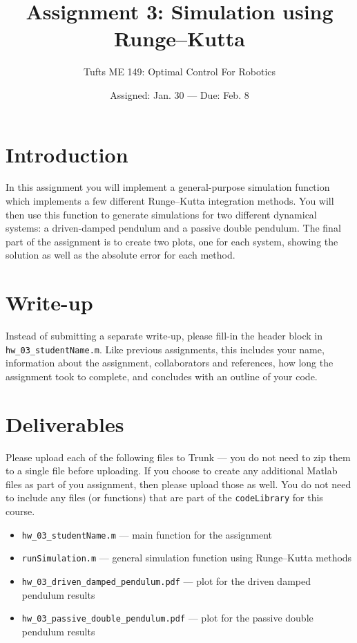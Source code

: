 

\title{Assignment 3:  Simulation using Runge--Kutta}
\date{Assigned:  Jan. 30  ---  Due:  Feb. 8}
\author{Tufts ME 149:  Optimal Control For Robotics}

\maketitle

\section*{Introduction}

In this assignment you will implement a general-purpose simulation function
which implements a few different Runge--Kutta integration methods.
You will then use this function to generate simulations for two different dynamical systems:
a driven-damped pendulum and a passive double pendulum.
The final part of the assignment is to create two plots, one for each system,
showing the solution as well as the absolute error for each method.

\section*{Write-up}

Instead of submitting a separate write-up,
please fill-in the header block in \texttt{hw\_03\_studentName.m}.
Like previous assignments, this includes
your name, information about the assignment, collaborators and references,
how long the assignment took to complete, and
concludes with an outline of your code.

\section*{Deliverables}

Please upload each of the following files to Trunk ---
you do not need to zip them to a single file before uploading.
If you choose to create any additional Matlab files as part of you assignment,
then please upload those as well.
You do not need to include any files (or functions)
that are part of the \texttt{codeLibrary} for this course.

\vspace{-0.6em} \begin{itemize}  \setlength\itemsep{0em}
 \item \texttt{hw\_03\_studentName.m} --- main function for the assignment
 \item \texttt{runSimulation.m} --- general simulation function using Runge--Kutta methods
 \item \texttt{hw\_03\_driven\_damped\_pendulum.pdf} --- plot for the driven damped pendulum results
 \item \texttt{hw\_03\_passive\_double\_pendulum.pdf} --- plot for the passive double pendulum results
\end{itemize}

